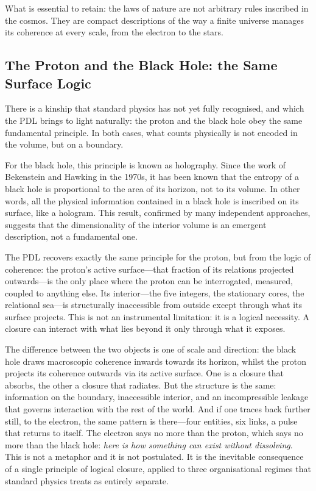 \documentclass[12pt, a4paper, openright]{book}
\begin{document}
What is essential to retain: the laws of nature are not arbitrary rules inscribed in the cosmos. They are compact descriptions of the way a finite universe manages its coherence at every scale, from the electron to the stars.

\subsection*{The Proton and the Black Hole: the Same Surface Logic}

There is a kinship that standard physics has not yet fully recognised, and which the PDL brings to light naturally: the proton and the black hole obey the same fundamental principle. In both cases, what counts physically is not encoded in the volume, but on a boundary.

\medskip

For the black hole, this principle is known as holography. Since the work of Bekenstein and Hawking in the 1970s, it has been known that the entropy of a black hole is proportional to the area of its horizon, not to its volume. In other words, all the physical information contained in a black hole is inscribed on its surface, like a hologram. This result, confirmed by many independent approaches, suggests that the dimensionality of the interior volume is an emergent description, not a fundamental one.

\medskip

The PDL recovers exactly the same principle for the proton, but from the logic of coherence: the proton's active surface---that fraction of its relations projected outwards---is the only place where the proton can be interrogated, measured, coupled to anything else. Its interior---the five integers, the stationary cores, the relational sea---is structurally inaccessible from outside except through what its surface projects. This is not an instrumental limitation: it is a logical necessity. A closure can interact with what lies beyond it only through what it exposes.

\medskip

The difference between the two objects is one of scale and direction: the black hole draws macroscopic coherence inwards towards its horizon, whilst the proton projects its coherence outwards via its active surface. One is a closure that absorbs, the other a closure that radiates. But the structure is the same: information on the boundary, inaccessible interior, and an incompressible leakage that governs interaction with the rest of the world. And if one traces back further still, to the electron, the same pattern is there---four entities, six links, a pulse that returns to itself. The electron says no more than the proton, which says no more than the black hole: \emph{here is how something can exist without dissolving}. This is not a metaphor and it is not postulated. It is the inevitable consequence of a single principle of logical closure, applied to three organisational regimes that standard physics treats as entirely separate.
\end{document}
